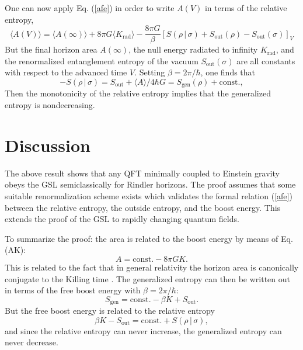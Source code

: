 \documentclass{article}
\begin{document}
One can now apply Eq. (\ref{afe}) in order to write $A(V)$ in terms of the relative entropy,
\begin{equation}
\langle A(V) \rangle = \langle A(\infty) \rangle + 8\pi G \langle K_\mathrm{rad} \rangle - \frac{8\pi G}{\beta}[S(\rho\,|\,\sigma) + S_\mathrm{out}(\rho) - S_\mathrm{out}(\sigma)]_V
\end{equation}
But the final horizon area $A(\infty)$, the null energy radiated to infinity $K_\mathrm{rad}$, and the renormalized entanglement entropy of the vacuum $S_\mathrm{out}(\sigma)$ are all constants with respect to the advanced time $V$.  Setting $\beta = 2\pi / \hbar$, one finds that
\begin{equation}\label{final}
-S(\rho\,|\,\sigma) = 
S_\mathrm{out} + \langle A \rangle /{4\hbar G} = S_\mathrm{gen}(\rho) + \mathrm{const.},
\end{equation}
Then the monotonicity of the relative entropy implies that the generalized entropy is nondecreasing.

\section{Discussion}\label{dis}

The above result shows that any QFT minimally coupled to Einstein gravity obeys the GSL semiclassically for Rindler horizons.  The proof assumes that some suitable renormalization scheme exists which validates the formal relation (\ref{afe}) between the relative entropy, the outside entropy, and the boost energy.  This extends the proof of the GSL to rapidly changing quantum fields.

To summarize the proof: the area is related to the boost energy by means of Eq. (AK):
\begin{equation}
A = \mathrm{const.} - 8\pi G K.
\end{equation}
This is related to the fact that in general relativity the horizon area is canonically conjugate to the Killing time \cite{CT93}.  The generalized entropy can then be written out in terms of the free boost energy with $\beta = 2\pi / \hbar$:
\begin{equation}
S_\mathrm{gen} = \mathrm{const.} - \beta K + S_\mathrm{out}.
\end{equation}
But the free boost energy is related to the relative entropy
\begin{equation}
\beta K - S_\mathrm{out} = \mathrm{const.} + S(\rho\,|\,\sigma),
\end{equation}
and since the relative entropy can never increase, the generalized entropy can never decrease.
\end{document}
